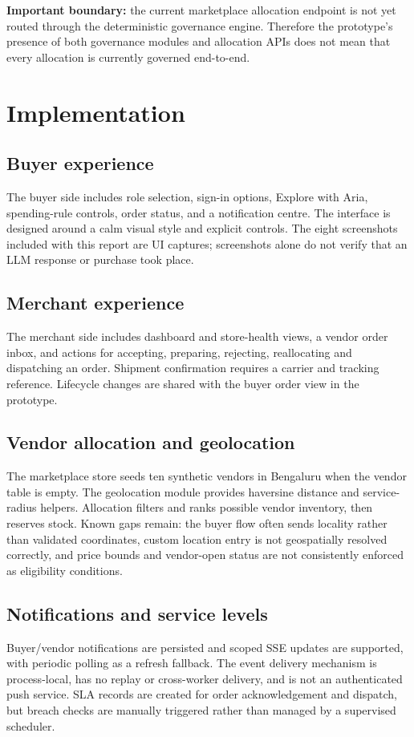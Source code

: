 \documentclass[12pt,a4paper]{report}
\begin{document}
\textbf{Important boundary:} the current marketplace allocation endpoint is
not yet routed through the deterministic governance engine. Therefore the
prototype's presence of both governance modules and allocation APIs does not
mean that every allocation is currently governed end-to-end.

\chapter{Implementation}

\section{Buyer experience}
The buyer side includes role selection, sign-in options, Explore with Aria,
spending-rule controls, order status, and a notification centre. The interface
is designed around a calm visual style and explicit controls. The eight
screenshots included with this report are UI captures; screenshots alone do
not verify that an LLM response or purchase took place.

\section{Merchant experience}
The merchant side includes dashboard and store-health views, a vendor order
inbox, and actions for accepting, preparing, rejecting, reallocating and
dispatching an order. Shipment confirmation requires a carrier and tracking
reference. Lifecycle changes are shared with the buyer order view in the
prototype.

\section{Vendor allocation and geolocation}
The marketplace store seeds ten synthetic vendors in Bengaluru when the
vendor table is empty. The geolocation module provides haversine distance and
service-radius helpers. Allocation filters and ranks possible vendor
inventory, then reserves stock. Known gaps remain: the buyer flow often sends
locality rather than validated coordinates, custom location entry is not
geospatially resolved correctly, and price bounds and vendor-open status are
not consistently enforced as eligibility conditions.

\section{Notifications and service levels}
Buyer/vendor notifications are persisted and scoped SSE updates are supported,
with periodic polling as a refresh fallback. The event delivery mechanism is
process-local, has no replay or cross-worker delivery, and is not an
authenticated push service. SLA records are created for order acknowledgement
and dispatch, but breach checks are manually triggered rather than managed by
a supervised scheduler.
\end{document}
